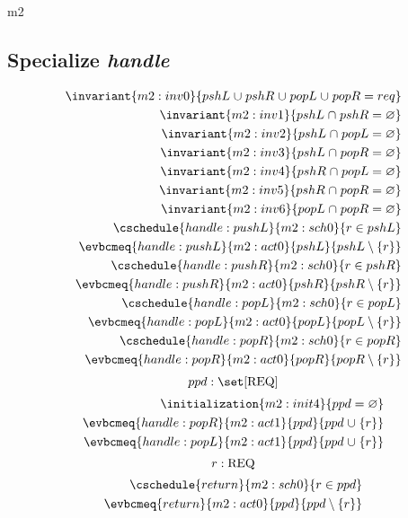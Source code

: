 \documentclass[12pt]{amsart}
\newcommand{\REQ}{\text{REQ}}
\begin{document}
\begin{machine}{m2}
  \subsection{Specialize \emph{handle}}
  \begin{align}
    \invariant{m2:inv0}{ pshL \bunion 
        pshR \bunion 
        popL \bunion 
        popR 
        = req } \\
    \invariant{m2:inv1}{ pshL \binter pshR = \emptyset } \\
    \invariant{m2:inv2}{ pshL \binter popL = \emptyset } \\
    \invariant{m2:inv3}{ pshL \binter popR = \emptyset } \\
    \invariant{m2:inv4}{ pshR \binter popL = \emptyset } \\
    \invariant{m2:inv5}{ pshR \binter popR = \emptyset } \\
    \invariant{m2:inv6}{ popL \binter popR = \emptyset } \\
    \cschedule{handle:pushL}{m2:sch0}{ r \in pshL } \\
    \evbcmeq{handle:pushL}{m2:act0}{pshL}{pshL \setminus \{ r \}} \\
    \cschedule{handle:pushR}{m2:sch0}{ r \in pshR } \\
    \evbcmeq{handle:pushR}{m2:act0}{pshR}{pshR \setminus \{ r \}} \\
    \cschedule{handle:popL}{m2:sch0}{ r \in popL } \\
    \evbcmeq{handle:popL}{m2:act0}{popL}{popL \setminus \{ r \}} \\
    \cschedule{handle:popR}{m2:sch0}{ r \in popR } \\
    \evbcmeq{handle:popR}{m2:act0}{popR}{popR \setminus \{ r \}} 
  \end{align}
  \[ \variable{ ppd : \set [\REQ] } \]
  \begin{align}
    \initialization{m2:init4}{ ppd = \emptyset } \\
    \evbcmeq{handle:popR}{m2:act1}{ppd}{ ppd \bunion \{r\} } \\
    \evbcmeq{handle:popL}{m2:act1}{ppd}{ ppd \bunion \{r\} }
  \end{align}
  \[ \indices{return}{ r : \REQ } \]
  \begin{align}
    \cschedule{return}{m2:sch0}{ r \in ppd } \\
    \evbcmeq{return}{m2:act0}{ppd}{ ppd \setminus \{ r \} }
  \end{align}

\end{machine}
\end{document}

